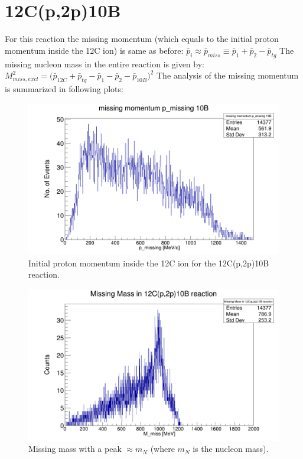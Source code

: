 \documentclass{report}
\begin{document}
\section{12C(p,2p)10B}
For this reaction the missing momentum (which equals to the initial proton momentum inside the 12C ion) is same as before:\newline
$\bar{p}_{i} \approx \bar{p}_{miss} \equiv \bar{p}_{1} + \bar{p}_{2} - \bar{p}_{tg}$ \newline
The missing nucleon mass in the entire reaction is given by:\newline
$M^2_{miss,excl} = \big(\bar{p}_{12C} + \bar{p}_{tg} - \bar{p}_{1} - \bar{p}_{2} - \bar{p}_{10B}\big)^2$\newline
The analysis of the missing momentum is summarized in following plots:\newline
\begin{figure}[!htb]
  \includegraphics[width=\linewidth]{missing_mom_12C_10B.png}
  \caption{Initial proton momentum inside the 12C ion for the 12C(p,2p)10B reaction.}
\end{figure}
\newline
\begin{figure}[!htb]
  \includegraphics[width=\linewidth]{missing_mass_12C_10B.png}
  \caption{Missing mass with a peak $\approx m_{N}$ (where $m_{N}$ is the nucleon mass).}
\end{figure}
\newline
\newpage
\end{document}

